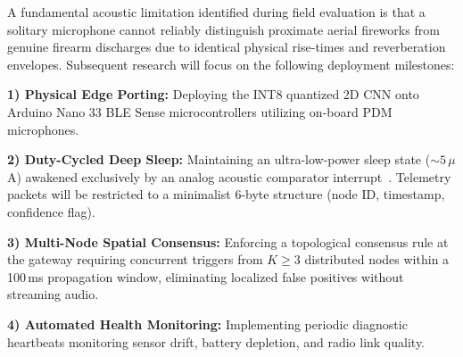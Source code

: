 \documentclass[conference]{IEEEtran}
\begin{document}
A fundamental acoustic limitation identified during field evaluation is that a solitary microphone cannot reliably distinguish proximate aerial fireworks from genuine firearm discharges due to identical physical rise-times and reverberation envelopes. Subsequent research will focus on the following deployment milestones:

\textbf{1) Physical Edge Porting:} Deploying the INT8 quantized 2D CNN onto Arduino Nano 33 BLE Sense microcontrollers utilizing on-board PDM microphones.

\textbf{2) Duty-Cycled Deep Sleep:} Maintaining an ultra-low-power sleep state ($\sim 5\,\mu$A) awakened exclusively by an analog acoustic comparator interrupt~\cite{cerutti2021}. Telemetry packets will be restricted to a minimalist 6-byte structure (node ID, timestamp, confidence flag).

\textbf{3) Multi-Node Spatial Consensus:} Enforcing a topological consensus rule at the gateway requiring concurrent triggers from $K \ge 3$ distributed nodes within a 100\,ms propagation window, eliminating localized false positives without streaming audio.

\textbf{4) Automated Health Monitoring:} Implementing periodic diagnostic heartbeats monitoring sensor drift, battery depletion, and radio link quality.



\end{document}
